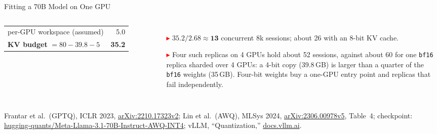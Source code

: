 \begin{frame}{Fitting a 70B Model on One GPU}
\begin{columns}[T,onlytextwidth]
{\begin{tabular}{>{\raggedright\arraybackslash}p{6.0cm} r}
        per-GPU workspace (assumed) & 5.0 \\
        \textbf{KV budget} $= 80 - 39.8 - 5$ & \textbf{35.2} \\
        \bottomrule
      \end{tabular}\par}
      \begin{itemize}\scriptsize\itemsep0.2em
        \item[\textcolor{red}{$\blacktriangleright$}] $35.2 / 2.68 \approx \mathbf{13}$ concurrent 8k sessions; about 26 with an 8-bit KV cache.
        \item[\textcolor{red}{$\blacktriangleright$}] Four such replicas on 4 GPUs hold about 52 sessions, against about 60 for one \texttt{bf16} replica sharded over 4 GPUs: a 4-bit copy (39.8\,GB) is larger than a quarter of the \texttt{bf16} weights (35\,GB). Four-bit weights buy a one-GPU entry point and replicas that fail independently.
      \end{itemize}
  \end{columns}
  \vspace{0.1em}
  {\scriptsize Frantar et al.\ (GPTQ), ICLR 2023, \href{https://arxiv.org/abs/2210.17323v2}{arXiv:2210.17323v2}; Lin et al.\ (AWQ), MLSys 2024, \href{https://arxiv.org/abs/2306.00978v5}{arXiv:2306.00978v5}, Table~4; checkpoint: \href{https://huggingface.co/hugging-quants/Meta-Llama-3.1-70B-Instruct-AWQ-INT4}{hugging-quants/Meta-Llama-3.1-70B-Instruct-AWQ-INT4}; vLLM, ``Quantization,'' \href{https://docs.vllm.ai/en/latest/features/quantization/}{docs.vllm.ai}.\par}
\end{frame}
